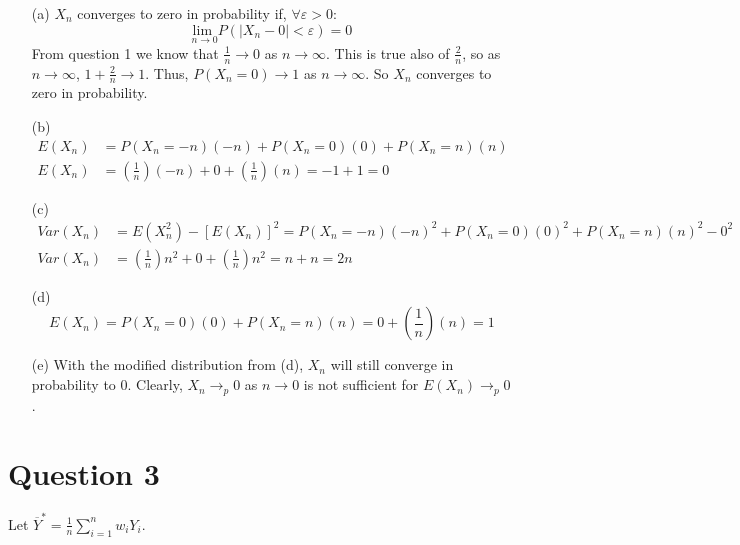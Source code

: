 \documentclass{article}
\newcommand{\est}[1]{\frac{1}{#1}\sum_{i=1}^{#1}}
\begin{document}
\begin{itemize}
	\item[(a)] $X_n$ converges to zero in probability if, $\forall\varepsilon>0$:
		\[
			\underset{n\rightarrow 0}{\text{lim }}P(|X_n-0|<\varepsilon)=0
		\]
		From question 1 we know that $\frac{1}{n}\rightarrow 0$ as $n\rightarrow\infty$. This is true also of $\frac{2}{n}$, so as $n\rightarrow\infty$, ${1+\frac{2}{n}\rightarrow1}$. Thus, $P(X_n=0)\rightarrow1$ as $n\rightarrow\infty$. So $X_n$ converges to zero in probability.
		
	\item[(b)] 
		\begin{align*}
			E(X_n) &= P(X_n=-n)(-n) + P(X_n=0)(0) + P(X_n=n)(n)  \\
			E(X_n) &= \left(\frac{1}{n}\right)(-n) + 0 + \left(\frac{1}{n}\right)(n)=-1 + 1  = 0
		\end{align*}
	
	\item[(c)] 
		\begin{align*}
			Var(X_n) &= E(X_n^2) - \left[E(X_n)\right]^2 = P(X_n=-n)(-n)^2 + P(X_n=0)(0)^2 + P(X_n=n)(n)^2 - 0^2	\\
			Var(X_n) &= \left(\frac{1}{n}\right)n^2 + 0 + \left(\frac{1}{n}\right)n^2 = n + n = 2n
		\end{align*}
	
	\item[(d)] 
		\[
			E(X_n) = P(X_n=0)(0) + P(X_n=n)(n) = 0 + \left(\frac{1}{n}\right)(n) = 1
		\]
		
	\item[(e)] With the modified distribution from (d), $X_n$ will still converge in probability to 0. Clearly, $X_n\rightarrow_p 0$ as $n\rightarrow 0$ is not sufficient for $E(X_n)\rightarrow_p 0$. 
		
\end{itemize}



\section*{Question 3}
Let $\overline{Y}^*=\est{n}w_iY_i$.
\end{document}
